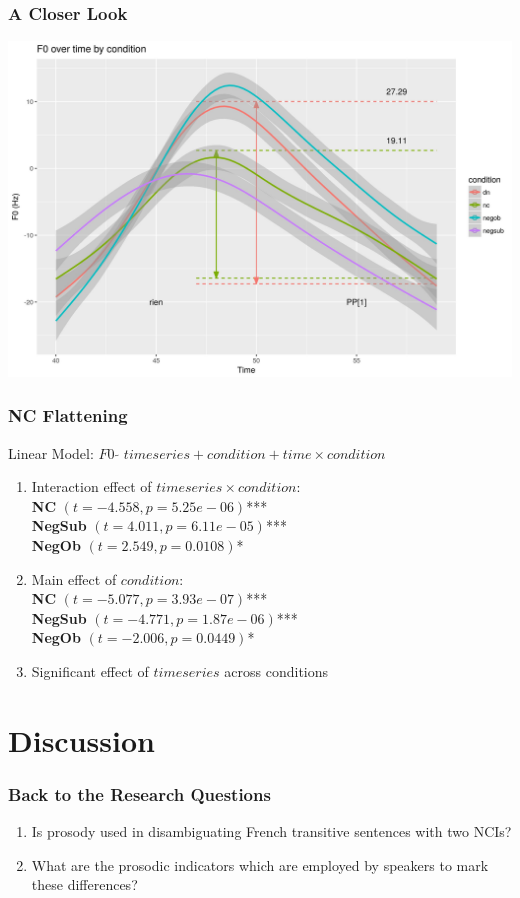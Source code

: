 \documentclass{beamer}
\begin{document}
\begin{frame}
\frametitle{A Closer Look}
\begin{center}
\includegraphics[width=\linewidth]{figures/zoomed_triangles.jpeg}
\end{center}
\end{frame}

\begin{frame}
\frametitle{NC Flattening}
\label{lm}
\begin{block}{Linear Model:}
$F0$ $\tilde{}$  $time series + condition + time \times condition$
	\begin{enumerate}
	\item Interaction effect of $time series \times condition$: \\ 
	\textbf{NC} $(t= -4.558,p=5.25e-06)$***\\\textbf{NegSub} $(t=4.011,p=6.11e-05)$***\\\textbf{NegOb} $(t=2.549,p=0.0108)$*
	\item Main effect of $condition$:\\
	 \textbf{NC} $(t=-5.077,p=3.93e-07)$***\\ \textbf{NegSub} $(t=-4.771,p=1.87e-06)$***\\ \textbf{NegOb} $(t=-2.006,p=0.0449)$*
	\item Significant effect of $time series$ across conditions
	\end{enumerate}
\end{block}
\hyperlink{routput}{}
\hyperlink{routput:lmem}{}
\hyperlink{routput:anova}{}
\end{frame}


\section{Discussion}
\begin{frame}
\frametitle{Back to the Research Questions}
\begin{enumerate}
\item Is prosody used in disambiguating French transitive sentences with two NCIs?
\item What are the prosodic indicators which are employed by speakers to mark these differences?
\end{enumerate}
\end{frame}
\end{document}
